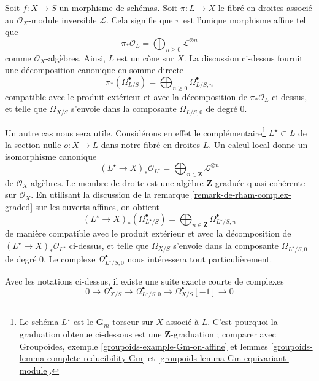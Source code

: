 \medskip\noindent
Soit $f : X \to S$ un morphisme de schémas. Soit $\pi : L \to X$ le
fibré en droites associé au $\mathcal{O}_X$-module inversible $\mathcal{L}$.
Cela signifie que $\pi$ est l'unique morphisme affine tel que
$$
\pi_*\mathcal{O}_L = 
\bigoplus\nolimits_{n \geq 0} \mathcal{L}^{\otimes n}
$$
comme $\mathcal{O}_X$-algèbres. Ainsi, $L$ est un cône sur $X$.
La discussion ci-dessus fournit une
décomposition canonique en somme directe
$$
\pi_*(\Omega^\bullet_{L/S}) =
\bigoplus\nolimits_{n \geq 0} \Omega^\bullet_{L/S, n}
$$
compatible avec le produit extérieur et avec la décomposition
de $\pi_*\mathcal{O}_L$ ci-dessus, et telle que $\Omega_{X/S}$
s'envoie dans la composante $\Omega_{L/S, 0}$ de degré $0$.

\medskip\noindent
Un autre cas nous sera utile. Considérons en effet le
complémentaire\footnote{Le schéma $L^\star$ est le $\mathbf{G}_m$-torseur
sur $X$ associé à $L$. C'est pourquoi la graduation obtenue ci-dessous est
une $\mathbf{Z}$-graduation ; comparer avec Groupoïdes,
exemple \ref{groupoids-example-Gm-on-affine} et
lemmes \ref{groupoids-lemma-complete-reducibility-Gm} et
\ref{groupoids-lemma-Gm-equivariant-module}.}
$L^\star \subset L$ de la section nulle $o : X \to L$ dans notre fibré
en droites $L$. Un calcul local donne un isomorphisme canonique
$$
(L^\star \to X)_*\mathcal{O}_{L^\star} =
\bigoplus\nolimits_{n \in \mathbf{Z}} \mathcal{L}^{\otimes n}
$$
de $\mathcal{O}_X$-algèbres. Le membre de droite est une algèbre $\mathbf{Z}$-graduée
quasi-cohérente sur $\mathcal{O}_X$. En utilisant la discussion de la
remarque \ref{remark-de-rham-complex-graded} sur les ouverts affines, on obtient
$$
(L^\star \to X)_*(\Omega^\bullet_{L^\star/S}) =
\bigoplus\nolimits_{n \in \mathbf{Z}} \Omega^\bullet_{L^\star/S, n}
$$
de manière compatible avec le produit extérieur et avec la décomposition
de $(L^\star \to X)_*\mathcal{O}_{L^\star}$ ci-dessus, et telle que
$\Omega_{X/S}$ s'envoie dans la composante $\Omega_{L^\star/S, 0}$ de degré $0$.
Le complexe $\Omega^\bullet_{L^\star/S, 0}$ nous intéressera
tout particulièrement.

\begin{lemma}
\label{lemma-the-complex-for-L-star}
Avec les notations ci-dessus, il existe une suite exacte courte de complexes
$$
0 \to \Omega^\bullet_{X/S} \to
\Omega^\bullet_{L^\star/S, 0} \to
\Omega^\bullet_{X/S}[-1] \to 0
$$
\end{lemma}

